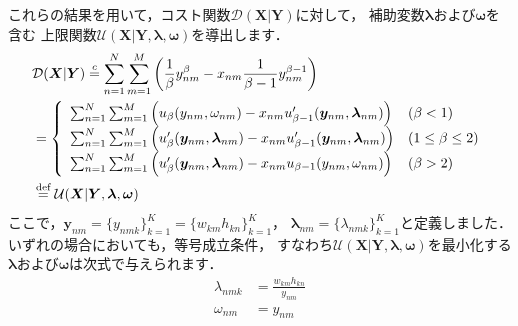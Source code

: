 これらの結果を用いて，コスト関数$\mathcal{D}(\bm{X}|\bm{Y})$に対して，
補助変数$\bm\lambda$および$\bm\omega$を含む
上限関数$\mathcal{U}(\bm{X}|\bm{Y},\bm\lambda,\bm\omega)$を導出します．
\begin{align}
&\mathcal{D}(\bm{X}|\bm{Y}) 
\overset{c}{=}
\sum_{n=1}^N \sum_{m=1}^M 
\left(
\frac{1}{\beta} y_{nm}^\beta - x_{nm} \frac{1}{\beta - 1} y_{nm}^{\beta - 1}
\right)
\nonumber\\
&=
\left\{
\begin{array}{ll}
\sum_{n=1}^N \sum_{m=1}^M \left(u_\beta(y_{nm},\omega_{nm})           
- x_{nm} u'_{\beta - 1}(\bm{y}_{nm},\bm\lambda_{nm})\right) & (\beta < 1) \\
\sum_{n=1}^N \sum_{m=1}^M \left(u'_\beta(\bm{y}_{nm},\bm\lambda_{nm}) 
- x_{nm} u'_{\beta - 1}(\bm{y}_{nm},\bm\lambda_{nm})\right) & (1 \le \beta \le 2) \\
\sum_{n=1}^N \sum_{m=1}^M \left(u'_\beta(\bm{y}_{nm},\bm\lambda_{nm}) 
- x_{nm} u_{\beta - 1}(y_{nm},\omega_{nm})\right) & (\beta > 2)
\end{array}
\right.
\nonumber\\
&\overset{\mbox{\scriptsize{def}}}{=}
\mathcal{U}(\bm{X}|\bm{Y},\bm\lambda,\bm\omega)
\label{eqn:beta_nmf_u}
\end{align}
ここで，$\bm{y}_{nm} = \{y_{nmk}\}_{k=1}^K = \{w_{km}h_{kn}\}_{k=1}^K$，
$\bm\lambda_{nm} = \{\lambda_{nmk}\}_{k=1}^K$と定義しました．
いずれの場合においても，等号成立条件，
すなわち$\mathcal{U}(\bm{X}|\bm{Y},\bm\lambda,\bm\omega)$を最小化する
$\bm\lambda$および$\bm\omega$は次式で与えられます．
\begin{align}
\lambda_{nmk} 
&= \frac{w_{km}h_{kn}}{y_{nm}}
\label{eqn:beta_nmf_mu_lambda}
\\
\omega_{nm} &= y_{nm}
\label{eqn:beta_nmf_mu_omega}
\end{align}

